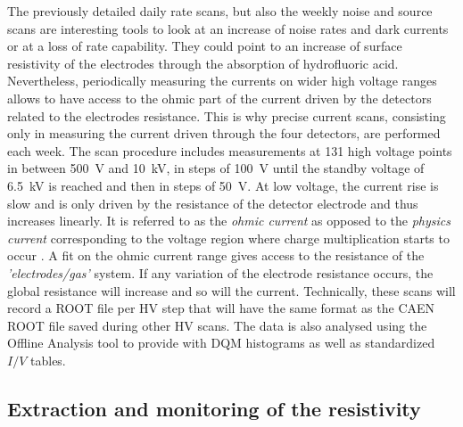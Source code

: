 	The previously detailed daily rate scans, but also the weekly noise and source scans are interesting tools to look at an increase of noise rates and dark currents or at a loss of rate capability. They could point to an increase of surface resistivity of the electrodes through the absorption of hydrofluoric acid. Nevertheless, periodically measuring the currents on wider high voltage ranges allows to have access to the ohmic part of the current driven by the detectors related to the electrodes resistance. This is why precise current scans, consisting only in measuring the current driven through the four detectors, are performed each week. The scan procedure includes measurements at 131 high voltage points in between \SI{500}{V} and \SI{10}{kV}, in steps of \SI{100}{V} until the standby voltage of \SI{6.5}{kV} is reached and then in steps of \SI{50}{V}. At low voltage, the current rise is slow and is only driven by the resistance of the detector electrode and thus increases linearly. It is referred to as the \textit{ohmic current} as opposed to the \textit{physics current} corresponding to the voltage region where charge multiplication starts to occur . A fit on the ohmic current range gives access to the resistance of the \textit{'electrodes/gas'} system. If any variation of the electrode resistance occurs, the global resistance will increase and so will the current. Technically, these scans will record a ROOT file per HV step that will have the same format as the CAEN ROOT file saved during other HV scans. The data is also analysed using the Offline Analysis tool to provide with DQM histograms as well as standardized $I/V$ tables.
	
\endgroup
	
	\subsection{Extraction and monitoring of the resistivity}
	\label{chapt5:ssec:resistivity}
	
\begingroup\setlength{\intextsep}{0pt}\setlength{\columnsep}{15pt}
	
